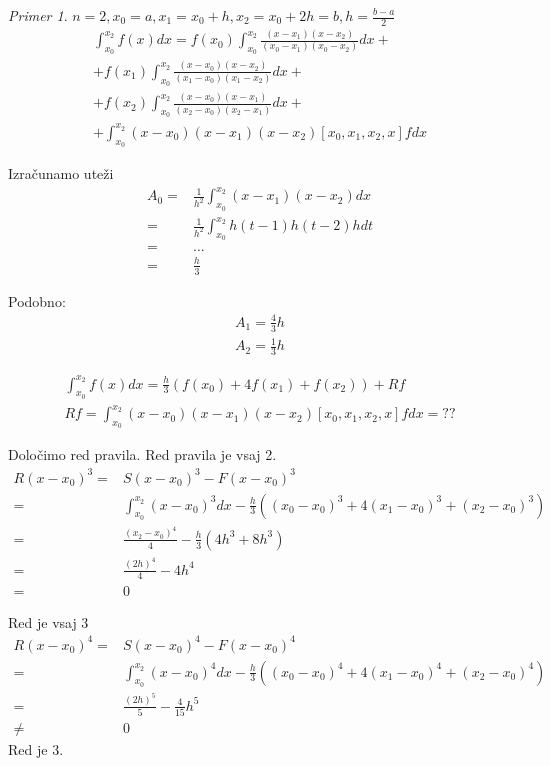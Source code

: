 \documentclass[a4paper,12pt]{article}
\theoremstyle{definition}
\theoremstyle{remark}
\newtheorem*{ex}{Primer}
\begin{document}
\begin{ex}
    $n = 2, x_0 = a, x_1 = x_0 + h, x_2 = x_0 + 2h = b, h = \frac{b-a}{2}$
    \begin{multline*}
        \int_{x_0}^{x_2} f(x) dx = f(x_0) \int_{x_0}^{x_2} \frac{(x-x_1)(x-x_2)}{(x_0-x_1)(x_0-x_2)} dx + \\
        + f(x_1) \int_{x_0}^{x_2} \frac{(x-x_0)(x-x_2)}{(x_1-x_0)(x_1-x_2)} dx + \\
        + f(x_2) \int_{x_0}^{x_2} \frac{(x-x_0)(x-x_1)}{(x_2-x_0)(x_2-x_1)} dx + \\
        + \int_{x_0}^{x_2} (x-x_0)(x-x_1)(x-x_2) [x_0, x_1, x_2, x] f dx
    \end{multline*}
    
    Izračunamo uteži
    \begin{align*}
        A_0 =& \frac{1}{h^2} \int_{x_0}^{x_2} (x-x_1)(x-x_2) dx \\
            =& \frac{1}{h^2} \int_{x_0}^{x_2} h(t-1) h(t-2) h dt \\
            =& \dots \\
            =& \frac{h}{3}
    \end{align*}

    Podobno:
    \begin{align*}
        A_1 = \frac{4}{3}h\\
        A_2 = \frac{1}{3} h
    \end{align*}


    \begin{gather*}
        \int_{x_0}^{x_2} f(x) dx = \frac{h}{3} (f(x_0) + 4f(x_1) + f(x_2)) + Rf \\
        Rf = \int_{x_0}^{x_2} (x-x_0)(x-x_1)(x-x_2)[x_0, x_1, x_2, x] f dx = ??
    \end{gather*}

    Določimo red pravila.
    Red pravila je vsaj 2.
    \begin{align*}
        R(x-x_0)^3 =& S(x-x_0)^3 - F(x-x_0)^3 \\
                   =& \int_{x_0}^{x_2} (x-x_0)^3 dx - \frac{h}{3} ((x_0-x_0)^3 + 4(x_1-x_0)^3 + (x_2 - x_0)^3) \\
                   =& \frac{(x_2-x_0)^4}{4} - \frac{h}{3}(4h^3 + 8h^3) \\
                   =& \frac{(2h)^4}{4} - 4h^4 \\
                   =& 0
    \end{align*}
    
    Red je vsaj 3
    \begin{align*}
        R(x-x_0)^4 =& S(x-x_0)^4 - F(x-x_0)^4 \\
                   =& \int_{x_0}^{x_2} (x-x_0)^4 dx - \frac{h}{3} ((x_0-x_0)^4 + 4(x_1-x_0)^4 + (x_2 - x_0)^4) \\
                   =& \frac{(2h)^5}{5} - \frac{4}{15}h^5 \\
                   \neq& 0
    \end{align*}
    Red je 3.


\end{ex}
\end{document}
